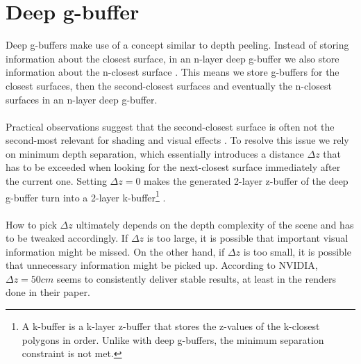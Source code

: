 \documentclass{ACGSeminar}
\begin{document}
\section{Deep g-buffer}
	Deep g-buffers make use of a concept similar to depth peeling. Instead of storing information about the closest surface, in an n-layer deep g-buffer we also store information about the n-closest surface \cite{Mara2016DeepGBuffer}. This means we store g-buffers for the closest surfaces, then the second-closest surfaces and eventually the n-closest surfaces in an n-layer deep g-buffer. \\\\
	Practical observations suggest that the second-closest surface is often not the second-most relevant for shading and visual effects \cite{Mara2016DeepGBuffer}. To resolve this issue we rely on minimum depth separation, which essentially introduces a distance $\Delta z$ that has to be exceeded when looking for the next-closest surface immediately after the current one. Setting $\Delta z = 0$ makes the generated 2-layer z-buffer of the deep g-buffer turn into a 2-layer k-buffer\footnote{A k-buffer is a k-layer z-buffer that stores the z-values of the k-closest polygons in order. Unlike with deep g-buffers, the minimum separation constraint is not met.} \cite{MFEKB}. \\\\
	How to pick $\Delta z$ ultimately depends on the depth complexity of the scene and has to be tweaked accordingly. If $\Delta z$ is too large, it is possible that important visual information might be missed. On the other hand, if $\Delta z$ is too small, it is possible that unnecessary information might be picked up. According to NVIDIA, $\Delta z = 50cm$ seems to consistently deliver stable results, at least in the renders done in their paper.
\end{document}
